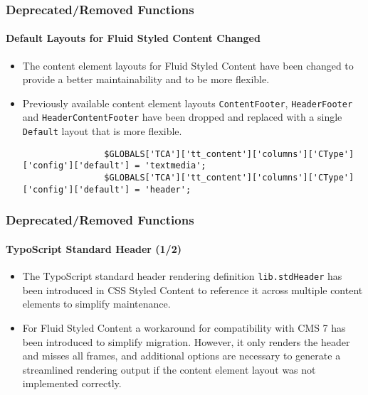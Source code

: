 \begin{frame}[fragile]
	\frametitle{Deprecated/Removed Functions}
	\framesubtitle{Default Layouts for Fluid Styled Content Changed}

	\lstset{basicstyle=\tiny\ttfamily}

	\begin{itemize}
		\item The content element layouts for Fluid Styled Content have been changed to provide a better
			maintainability and to be more flexible.

		\item Previously available content element layouts \texttt{ContentFooter}, \texttt{HeaderFooter} and
			\texttt{HeaderContentFooter} have been dropped and replaced with a single \texttt{Default} layout
			that is more flexible.

			\begin{lstlisting}
				$GLOBALS['TCA']['tt_content']['columns']['CType']['config']['default'] = 'textmedia';
				$GLOBALS['TCA']['tt_content']['columns']['CType']['config']['default'] = 'header';
			\end{lstlisting}

	\end{itemize}

\end{frame}


\begin{frame}[fragile]
	\frametitle{Deprecated/Removed Functions}
	\framesubtitle{TypoScript Standard Header (1/2)}

	\begin{itemize}
		\item The TypoScript standard header rendering definition \texttt{lib.stdHeader} has been introduced in
			CSS Styled Content to reference it across multiple content elements to simplify maintenance.

		\item For Fluid Styled Content a workaround for compatibility with CMS 7 has been introduced to simplify
			migration. However, it only renders the header and misses all frames, and additional options are
			necessary to generate a streamlined rendering output if the content element layout was not implemented
			correctly.

	\end{itemize}

\end{frame}

